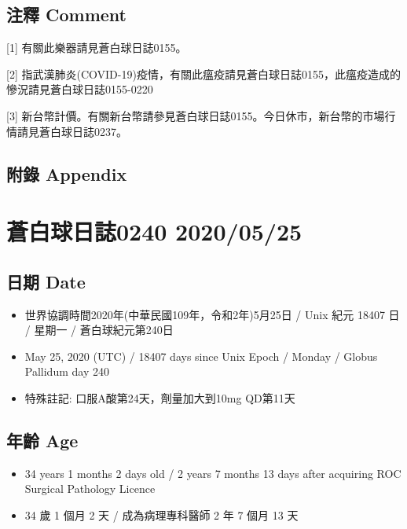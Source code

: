 \documentclass[a5paper, 12pt
]{book}
\providecommand{\tightlist}{%
  \setlength{\itemsep}{0pt}\setlength{\parskip}{0pt}}
\begin{document}
\hypertarget{ux6ce8ux91cb-comment-84}{%
\subsection{注釋 Comment}\label{ux6ce8ux91cb-comment-84}}

{[}1{]} 有關此樂器請見蒼白球日誌0155。

{[}2{]}
指武漢肺炎(COVID-19)疫情，有關此瘟疫請見蒼白球日誌0155，此瘟疫造成的慘況請見蒼白球日誌0155-0220

{[}3{]}
新台幣計價。有關新台幣請參見蒼白球日誌0155。今日休市，新台幣的市場行情請見蒼白球日誌0237。

\hypertarget{ux9644ux9304-appendix-84}{%
\subsection{附錄 Appendix}\label{ux9644ux9304-appendix-84}}

\hypertarget{ux84bcux767dux7403ux65e5ux8a8c0240-20200525}{%
\section{蒼白球日誌0240
2020/05/25}\label{ux84bcux767dux7403ux65e5ux8a8c0240-20200525}}

\hypertarget{ux65e5ux671f-date-85}{%
\subsection{日期 Date}\label{ux65e5ux671f-date-85}}

\begin{itemize}
\tightlist
\item
  世界協調時間2020年(中華民國109年，令和2年)5月25日 / Unix 紀元 18407 日
  / 星期一 / 蒼白球紀元第240日
\item
  May 25, 2020 (UTC) / 18407 days since Unix Epoch / Monday / Globus
  Pallidum day 240
\item
  特殊註記: 口服A酸第24天，劑量加大到10mg QD第11天
\end{itemize}

\hypertarget{ux5e74ux9f61-age-85}{%
\subsection{年齡 Age}\label{ux5e74ux9f61-age-85}}

\begin{itemize}
\tightlist
\item
  34 years 1 months 2 days old / 2 years 7 months 13 days after
  acquiring ROC Surgical Pathology Licence
\item
  34 歲 1 個月 2 天 / 成為病理專科醫師 2 年 7 個月 13 天
\end{itemize}
\end{document}
